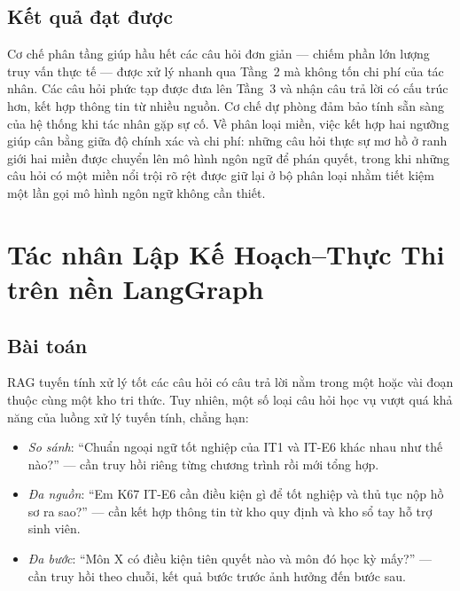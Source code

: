\documentclass[../DoAn.tex]{subfiles}
\begin{document}
\subsection{Kết quả đạt được}

Cơ chế phân tầng giúp hầu hết các câu hỏi đơn giản --- chiếm phần lớn lượng
truy vấn thực tế --- được xử lý nhanh qua Tầng~2 mà không tốn chi phí của tác
nhân. Các câu hỏi phức tạp được đưa lên Tầng~3 và nhận câu trả lời có cấu trúc
hơn, kết hợp thông tin từ nhiều nguồn. Cơ chế dự phòng đảm bảo tính sẵn sàng
của hệ thống khi tác nhân gặp sự cố. Về phân loại miền, việc kết hợp hai ngưỡng
giúp cân bằng giữa độ chính xác và chi phí: những câu hỏi thực sự mơ hồ ở ranh
giới hai miền được chuyển lên mô hình ngôn ngữ để phán quyết, trong khi những
câu hỏi có một miền nổi trội rõ rệt được giữ lại ở bộ phân loại nhằm tiết kiệm
một lần gọi mô hình ngôn ngữ không cần thiết.

\section{Tác nhân Lập Kế Hoạch--Thực Thi trên nền LangGraph}
\label{sec:ch5-agent}

\subsection{Bài toán}

RAG tuyến tính xử lý tốt các câu hỏi có câu trả lời nằm trong một hoặc vài
đoạn thuộc cùng một kho tri thức. Tuy nhiên, một số loại câu hỏi học vụ vượt
quá khả năng của luồng xử lý tuyến tính, chẳng hạn:

\begin{itemize}
    \item \textit{So sánh}: ``Chuẩn ngoại ngữ tốt nghiệp của IT1 và IT-E6 khác
    nhau như thế nào?'' --- cần truy hồi riêng từng chương trình rồi mới tổng hợp.
    \item \textit{Đa nguồn}: ``Em K67 IT-E6 cần điều kiện gì để tốt nghiệp và
    thủ tục nộp hồ sơ ra sao?'' --- cần kết hợp thông tin từ kho quy định và kho
    sổ tay hỗ trợ sinh viên.
    \item \textit{Đa bước}: ``Môn X có điều kiện tiên quyết nào và môn đó học kỳ
    mấy?'' --- cần truy hồi theo chuỗi, kết quả bước trước ảnh hưởng đến bước sau.
\end{itemize}
\end{document}
